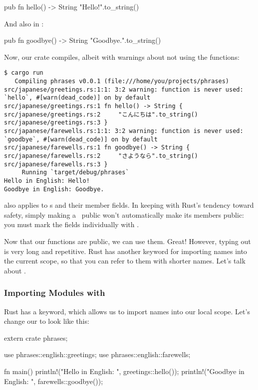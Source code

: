 \begin{rustc}
pub fn hello() -> String {
    "Hello!".to_string()
}
\end{rustc}

And also in :

\begin{rustc}
pub fn goodbye() -> String {
    "Goodbye.".to_string()
}
\end{rustc}

Now, our crate compiles, albeit with warnings about not using the  functions:

\begin{verbatim}
$ cargo run
   Compiling phrases v0.0.1 (file:///home/you/projects/phrases)
src/japanese/greetings.rs:1:1: 3:2 warning: function is never used: `hello`, #[warn(dead_code)] on by default
src/japanese/greetings.rs:1 fn hello() -> String {
src/japanese/greetings.rs:2     "こんにちは".to_string()
src/japanese/greetings.rs:3 }
src/japanese/farewells.rs:1:1: 3:2 warning: function is never used: `goodbye`, #[warn(dead_code)] on by default
src/japanese/farewells.rs:1 fn goodbye() -> String {
src/japanese/farewells.rs:2     "さようなら".to_string()
src/japanese/farewells.rs:3 }
     Running `target/debug/phrases`
Hello in English: Hello!
Goodbye in English: Goodbye.
\end{verbatim}

 also applies to \struct s and their member fields. In keeping with Rust's tendency toward safety, simply making a \struct\ 
public won't automatically make its members public: you must mark the fields individually with .

\blank

Now that our functions are public, we can use them. Great! However, typing out  is very long 
and repetitive. Rust has another keyword for importing names into the current scope, so that you can refer to them with shorter names. 
Let's talk about .

\subsubsection*{Importing Modules with }

Rust has a \code{use} keyword, which allows us to import names into our local scope. Let's change our  to look like this:

\begin{rustc}
extern crate phrases;

use phrases::english::greetings;
use phrases::english::farewells;

fn main() {
    println!("Hello in English: {}", greetings::hello());
    println!("Goodbye in English: {}", farewells::goodbye());
}
\end{rustc}

